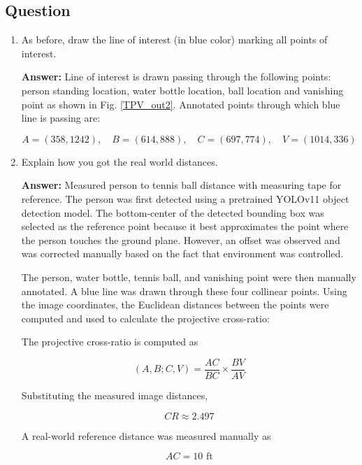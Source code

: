 
\subsection{Question}
\begin{enumerate}

\item As before, draw the line of interest (in blue color) marking all points of interest. 

	\textbf{Answer:} 
	Line of interest is drawn passing through the following points: person standing location, water bottle location, ball location and vanishing point as shown in Fig. \ref{TPV_out2}. Annotated points through which blue line is passing are:
	
	\[
A=(358,1242),\quad
B=(614,888),\quad
C=(697,774),\quad
V=(1014,336)
\]

  
\item Explain how you got the real world distances.

\begin{studentSpace}
    \textbf{Answer:} 
Measured person to tennis ball distance with measuring tape for reference. 
    The person was first detected using a pretrained YOLOv11 object detection model. The bottom-center of the detected bounding box was selected as the reference point because it best approximates the point where the person touches the ground plane. However, an offset was observed and was corrected manually based on the fact that environment was controlled.

The person, water bottle, tennis ball, and vanishing point were then manually annotated. A blue line was drawn through these four collinear points. Using the image coordinates, the Euclidean distances between the points were computed and used to calculate the projective cross-ratio:

The projective cross-ratio is computed as

\[
(A,B;C,V)
=
\frac{AC}{BC}
\times
\frac{BV}{AV}
\]

Substituting the measured image distances,

\[
CR \approx 2.497
\]

A real-world reference distance was measured manually as

\[
AC = 10 \text{ ft}
\]


\end{studentSpace}
\end{enumerate}
